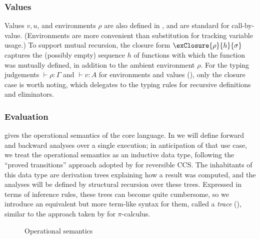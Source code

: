 \subsubsection{Values}
Values $v, u$, and environments $\rho$ are also defined in , and are standard for call-by-value. (Environments are more convenient than substitution for tracking variable usage.) To support mutual recursion, the closure form  $\exClosure{\rho}{h}{\sigma}$ captures the (possibly empty) sequence $h$ of functions with which the function was mutually defined, in addition to the ambient environment $\rho$. For the typing judgements $\vdash \rho: \Gamma$ and $\vdash v: A$ for environments and values (), only the closure case is worth noting, which delegates to the typing rules for recursive definitions and eliminators.

\subsubsection{Evaluation}
\label{sec:core-language:eval}

 gives the operational semantics of the core language. In  we will define forward and backward analyses over a single execution; in anticipation of that use case, we treat the operational semantics as an inductive data type, following the ``proved transitions'' approach adopted by \citet{boudol89} for reversible CCS. The inhabitants of this data type are derivation trees explaining how a result was computed, and the analyses will be defined by structural recursion over these trees. Expressed in terms of inference rules, these trees can become quite cumbersome, so we introduce an equivalent but more term-like syntax for them, called a \emph{trace} (), similar to the approach taken by \citet{perera16d} for $\pi$-calculus.



\begin{figure}
   \vspace{1mm}
   
   
   \caption{Operational semantics}
   \label{fig:core-language:semantics}
\end{figure}

